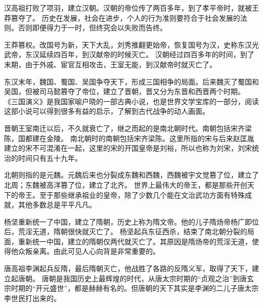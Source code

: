 \documentclass[avery5371,grid]{flashcards}
\begin{document}
{汉高祖打败了项羽，建立汉朝。汉朝的帝位传了两百多年，到了孝平帝时，就被王莽篡夺了。} %
{历史在发展，社会在进步，个人的行为准则要符合于社会发展的法则。否则即便得力于一时，但终究会以失败而告终。} %

{王莽篡权。改国号为新，天下大乱，刘秀推翻更始帝，恢复国号为汉，史称东汉光武帝，东汉延续四百年，到汉献帝的时候灭亡。} %
{汉朝经过四百多年的时间，到了末期，由于外戚、宦官互相攻击，王室无能，到汉献帝时就灭亡了。} %

{东汉末年，魏国、蜀国、吴国争夺天下，形成三国相争的局面。后来魏灭了蜀国和吴国，但被司马懿篡夺了帝位，建立了晋朝，晋又分为东晋和西晋两个时期。} %
{《三国演义》是我国家喻户晓的一部古典小说，也是世界文学宝库的一部分，阅读这部小说可以得到很多有益的启示，了解到古代战争的动人画面。} %

{晋朝王室南迁以后，不久就衰亡了，继之而起的是南北朝时代。南朝包括宋齐梁陈，国都建在金陵。} %
{南北朝时的南朝包括宋齐梁陈。这里所指的宋与后来赵匡胤建立的宋不可混淆在一起，这里的宋的开国皇帝是刘裕，所以也称为刘宋，刘宋统治的时间只有五十九年。} %

{北朝则指的是元魏。元魏后来也分裂成东魏和西魏，西魏被宇文觉篡了位，建立了北周；东魏被高洋篡了位，建立了北齐。} %
{世界上最伟大的帝王，都是那些开创天下的帝王。至于那些继承祖业的皇帝，除了少数几个能在文治武功方面有特殊成就，其他多数总是平平凡凡。} %

{杨坚重新统一了中国，建立了隋朝，历史上称为隋文帝。他的儿子隋炀帝杨广即位后，荒淫无道，隋朝很快就灭亡了。} %
{杨坚起兵东征西杀，结束了南北朝分裂的局面，重新统一中国，建立的隋朝仅两代就灭亡了。其原因是隋炀帝的荒淫无道，使得他众叛亲离。由此可见人心向背是非常重要的。} %

{唐高祖李渊起兵反隋，最后隋朝灭亡，他战胜了各路的反隋义军，取得了天下，建立起唐朝。} %
{唐朝是我国历史上最辉煌的时代，从唐太宗时期的“贞观之治”到唐玄宗时期的“开元盛世”，都是赫赫有名的。但唐朝的天下其实是李渊的二儿子唐太宗李世民打出来的。} %
\end{document}
